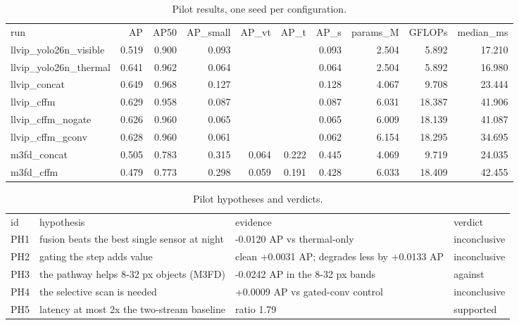 \begin{table}[htbp]
\centering
\caption{Pilot results, one seed per configuration.}
\label{tab:pilot}
\small
\begin{tabular}{@{}lrrrrrrrrr@{}}
run & AP & AP50 & AP\_small & AP\_vt & AP\_t & AP\_s & params\_M & GFLOPs & median\_ms \\ \addlinespace[5pt]
llvip\_yolo26n\_visible & 0.519 & 0.900 & 0.093 &  &  & 0.093 & 2.504 & 5.892 & 17.210 \\
llvip\_yolo26n\_thermal & 0.641 & 0.962 & 0.064 &  &  & 0.064 & 2.504 & 5.892 & 16.980 \\
llvip\_concat & 0.649 & 0.968 & 0.127 &  &  & 0.128 & 4.067 & 9.708 & 23.444 \\
llvip\_cffm & 0.629 & 0.958 & 0.087 &  &  & 0.087 & 6.031 & 18.387 & 41.906 \\
llvip\_cffm\_nogate & 0.626 & 0.960 & 0.065 &  &  & 0.065 & 6.009 & 18.139 & 41.087 \\
llvip\_cffm\_gconv & 0.628 & 0.960 & 0.061 &  &  & 0.062 & 6.154 & 18.295 & 34.695 \\
m3fd\_concat & 0.505 & 0.783 & 0.315 & 0.064 & 0.222 & 0.445 & 4.069 & 9.719 & 24.035 \\
m3fd\_cffm & 0.479 & 0.773 & 0.298 & 0.059 & 0.191 & 0.428 & 6.033 & 18.409 & 42.455 \\
\end{tabular}
\end{table}

\begin{table}[htbp]
\centering
\caption{Pilot hypotheses and verdicts.}
\label{tab:pilot-hyp}
\small
\begin{tabular}{@{}llll@{}}
id & hypothesis & evidence & verdict \\ \addlinespace[5pt]
PH1 & fusion beats the best single sensor at night & -0.0120 AP vs thermal-only & inconclusive \\
PH2 & gating the step adds value & clean +0.0031 AP; degrades less by +0.0133 AP & inconclusive \\
PH3 & the pathway helps 8-32 px objects (M3FD) & -0.0242 AP in the 8-32 px bands & against \\
PH4 & the selective scan is needed & +0.0009 AP vs gated-conv control & inconclusive \\
PH5 & latency at most 2x the two-stream baseline & ratio 1.79 & supported \\
\end{tabular}
\end{table}
